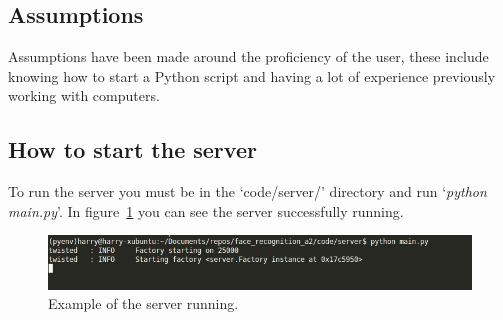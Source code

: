 \documentclass[a4paper]{article}
\begin{document}
    \subsection{Assumptions}
        Assumptions have been made around the proficiency of the user, these include knowing how to start a Python script and having a lot of
        experience previously working with computers.

    \subsection{How to start the server}
        To run the server you must be in the `code/server/' directory and run `\textit{python main.py}'. In figure~\ref{fig:serverrun} you can 
        see the server successfully running.
        \begin{figure}[H]
            \centering
            \caption{Example of the server running.}
            \label{fig:serverrun}
                \includegraphics[scale=0.6]{../shared_assets/screenshots/manual/serverrun.png}
        \end{figure}
\end{document}
